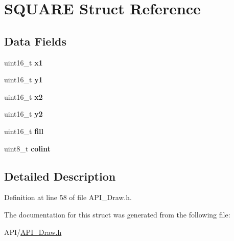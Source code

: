 \hypertarget{struct_s_q_u_a_r_e}{}\section{S\+Q\+U\+A\+RE Struct Reference}
\label{struct_s_q_u_a_r_e}
\subsection*{Data Fields}
\begin{DoxyCompactItemize}
\item 
\mbox{\label{struct_s_q_u_a_r_e_aedb5fdfe3c1d1a915b668ba7f3950753}} 
uint16\+\_\+t {\bfseries x1}
\item 
\mbox{\label{struct_s_q_u_a_r_e_a47ada631c22a9d40348069145654f255}} 
uint16\+\_\+t {\bfseries y1}
\item 
\mbox{\label{struct_s_q_u_a_r_e_ac5bc000f8954f38b7a641a485a26bae7}} 
uint16\+\_\+t {\bfseries x2}
\item 
\mbox{\label{struct_s_q_u_a_r_e_aa377184ba406b3f0c4ac18c935378204}} 
uint16\+\_\+t {\bfseries y2}
\item 
\mbox{\label{struct_s_q_u_a_r_e_abd83f5d2f2e1a767233d92cba99540f5}} 
uint16\+\_\+t {\bfseries fill}
\item 
\mbox{\label{struct_s_q_u_a_r_e_a21caa4b27a71b7967f1a2d64f196a674}} 
uint8\+\_\+t {\bfseries colint}
\end{DoxyCompactItemize}


\subsection{Detailed Description}


Definition at line 58 of file A\+P\+I\+\_\+\+Draw.\+h.



The documentation for this struct was generated from the following file\+:\begin{DoxyCompactItemize}
\item 
A\+P\+I/\hyperlink{_a_p_i___draw_8h}{A\+P\+I\+\_\+\+Draw.\+h}\end{DoxyCompactItemize}
